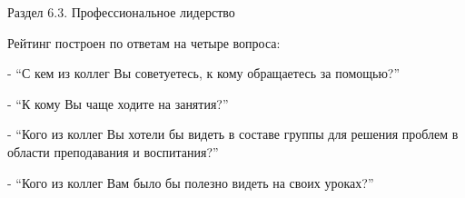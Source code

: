 \begin{frame}{Раздел 6.3. Профессиональное лидерство}


\tiny
Рейтинг построен по ответам на четыре вопроса:
\smallskip

- ``С кем из коллег Вы советуетесь, к кому обращаетесь за помощью?''
\smallskip

- ``К кому Вы чаще ходите на занятия?''
\smallskip

- ``Кого из коллег Вы хотели бы видеть в составе группы для решения проблем в области преподавания и воспитания?''
\smallskip

- ``Кого из коллег Вам было бы полезно видеть на своих уроках?''
\smallskip

\end{frame}


